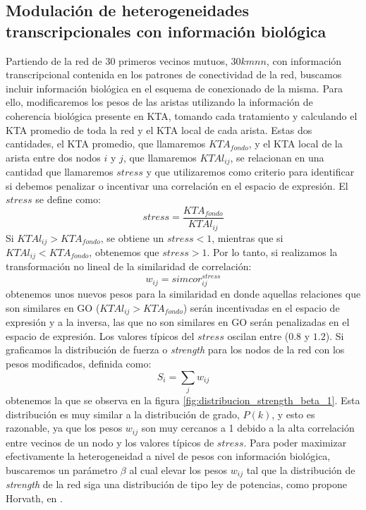\subsection{Modulación de heterogeneidades transcripcionales con información biológica}
Partiendo de la red de 30 primeros vecinos mutuos, $30kmnn$, con información transcripcional contenida en los patrones de conectividad de la red, buscamos incluir información biológica en el esquema de conexionado de la misma. Para ello, modificaremos los pesos de las aristas utilizando la información de coherencia biológica presente en KTA, tomando cada tratamiento y calculando el KTA promedio de toda la red y el KTA local de cada arista. Estas dos cantidades, el KTA promedio, que llamaremos $KTA_{fondo}$, y el KTA local de la arista entre dos nodos $i$ y $j$, que llamaremos $KTAl_{ij}$, se relacionan en una cantidad que llamaremos $stress$ y que utilizaremos como criterio para identificar si debemos penalizar o incentivar una correlación en el espacio de expresión. El $stress$ se define como:
\begin{equation}
	stress = \frac{KTA_{fondo}}{KTAl_{ij}}
	\label{eq:stress}
\end{equation}
Si $KTAl_{ij} > KTA_{fondo}$, se obtiene un $stress < 1$, mientras que si $KTAl_{ij} < KTA_{fondo}$, obtenemos que $stress > 1$. Por lo tanto, si realizamos la transformación no lineal de la similaridad de correlación:
\begin{equation}
	w_{ij} = simcor_{ij}^{stress}
	\label{eq:pesos_de_la_red}
\end{equation}
obtenemos unos nuevos pesos para la similaridad en donde aquellas relaciones que son similares en GO ($KTAl_{ij} > KTA_{fondo}$) serán incentivadas en el espacio de expresión y a la inversa, las que no son similares en GO serán penalizadas en el espacio de expresión. Los valores típicos del $stress$ oscilan entre ($0.8$ y $1.2$). Si graficamos la distribución de fuerza o \textit{strength} para los nodos de la red con los pesos modificados, definida como:
\begin{equation}
	S_i = \sum_j w_{ij}
	\label{eq:strength}
\end{equation}
obtenemos la que se observa en la figura \ref{fig:distribucion_strength_beta_1}. Esta distribución es muy similar a la distribución de grado, $P(k)$, y esto es razonable, ya que los pesos $w_{ij}$ son muy cercanos a 1 debido a la alta correlación entre vecinos de un nodo y los valores típicos de $stress$. Para poder maximizar efectivamente la heterogeneidad a nivel de pesos con información biológica, buscaremos un parámetro $\beta$ al cual elevar los pesos $w_{ij}$ tal que la distribución de \textit{strength} de la red siga una distribución de tipo ley de potencias, como propone Horvath, en \cite{Horvath2005}.\\\\
